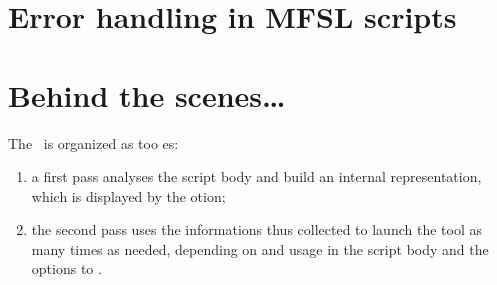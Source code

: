 \section{Error handling in MFSL scripts}


\section{Behind the scenes\dots}

The \mfslLangInterp\ is organized as too \pass es:
\begin{enumerate}
\item a first pass analyses the script body and build an internal representation, which is displayed by the  otion;

\item the second pass uses the informations thus collected to launch the tool as many times as needed, depending on  and  usage in the script body and the options to \mfslLangInterp.
\end{enumerate}

